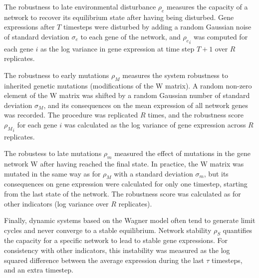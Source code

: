 \documentclass[10pt,a4paper]{article}
\newcommand{\stability}{{\rho_S}}
\newcommand{\lateenv}{{\rho_e}}
\newcommand{\earlymut}{{\rho_M}}
\newcommand{\latemut}{{\rho_m}}
\newcommand{\W}{\bm{\mathrm W}}
\begin{document}
The robustness to late environmental disturbance $\lateenv$ measures the capacity of a network to recover its equilibrium state after having being disturbed. Gene expressions after $T$ timesteps were disturbed by adding a random Gaussian noise of standard deviation $\sigma_e$ to each gene of the network, and $\lateenv_i$ was computed for each gene $i$ as the log variance in gene expression at time step $T+1$ over $R$ replicates. 

The robustness to early mutations $\earlymut$ measures the system robustness to inherited genetic mutations (modifications of the $\W$ matrix). A random non-zero element of the $\W$ matrix was shifted by a random Gaussian number of standard deviation $\sigma_M$, and its consequences on the mean expression of all network genes was recorded. The procedure was replicated $R$ times, and the robustness score $\earlymut_i$ for each gene $i$ was calculated as the log variance of gene expression across $R$ replicates. 

The robustess to late mutations $\latemut$ measured the effect of mutations in the gene network $\W$ after having reached the final state. In practice, the $\W$ matrix was mutated in the same way as for $\earlymut$ with a standard deviation $\sigma_m$, but its consequences on gene expression were calculated for only one timestep, starting from the last state of the network. The robustness score was calculated as for other indicators (log variance over $R$ replicates).

Finally, dynamic systems based on the Wagner model often tend to generate limit cycles and never converge to a stable equilibrium. Network stability $\stability$ quantifies the capacity for a specific network to lead to stable gene expressions.  For consistency with other indicators, this instability was measured as the log squared difference between the average expression during the last $\tau$ timesteps, and an extra timestep. 
\end{document}
